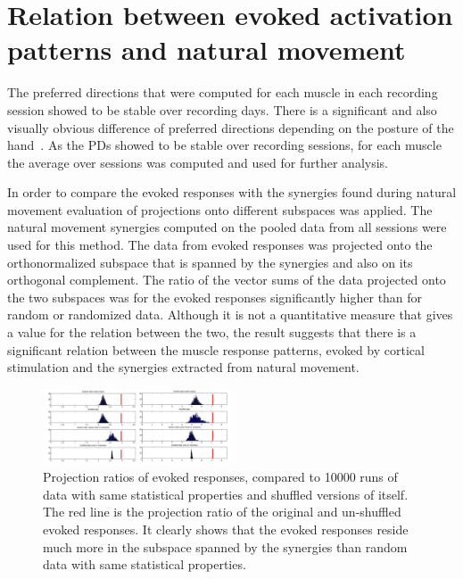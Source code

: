 \clearpage





\section{Relation between evoked activation patterns and natural movement} %
\label{sg:sec:synergy_relations}

The preferred directions that were computed for each muscle in each recording session showed to be stable over recording days. There is a significant and also visually obvious difference of preferred directions depending on the posture of the hand~. As the PDs showed to be stable over recording sessions, for each muscle the average over sessions was computed and used for further analysis.



In order to compare the evoked responses with the synergies found during natural movement evaluation of projections onto different subspaces was applied. The natural movement synergies computed on the pooled data from all sessions were used for this method. The data from evoked responses was projected onto the orthonormalized subspace that is spanned by the synergies and also on its orthogonal complement. The ratio of the vector sums of the data projected onto the two subspaces was for the evoked responses significantly higher than for random or randomized data. Although it is not a quantitative measure that gives a value for the relation between the two, the result suggests that there is a significant relation between the muscle response patterns, evoked by cortical stimulation and the synergies extracted from natural movement. 
\begin{figure}[ht]
	\centering
		\includegraphics[width=0.5\textwidth]{images/projections.jpg}
	\caption{Projection ratios of evoked responses, compared to 10000 runs of data with same statistical properties and shuffled versions of itself. The red line is the projection ratio of the original and un-shuffled evoked responses. It clearly shows that the evoked responses reside much more in the subspace spanned by the synergies than random data with same statistical properties.}
	\label{sg:fig:images_projection}
\end{figure}








